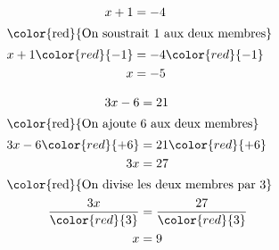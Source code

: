 \begin{exemple*1}
    \phantom{rrr}

    \begin{minipage}{0.5\linewidth}    
        \begin{center}
            \begin{align*}
                x+1&=-4\\\intertext{\color{red}{On soustrait 1 aux deux membres}}
                x+1\color{red}{-1}&=-4\color{red}{-1}\\
                x&=-5\\            
            \end{align*}
        \end{center}
    \end{minipage}
    \begin{minipage}{0.5\linewidth}    
        \begin{center}
            \begin{align*}
                3x-6&=21\\\intertext{\color{red}{On ajoute 6 aux deux membres}}
                3x-6\color{red}{+6}&=21\color{red}{+6}\\            
                3x&=27\\\intertext{\color{red}{On divise les deux membres par 3}}
                \dfrac{3x}{\color{red}{3}}&=\frac{27}{\color{red}{3}}\\
                x&=9\\
            \end{align*}
        \end{center}
    \end{minipage}
\end{exemple*1}


